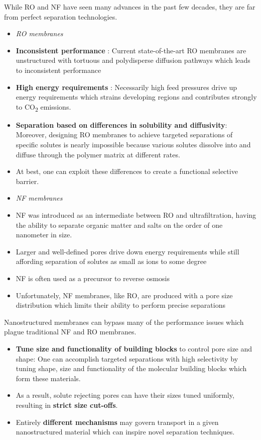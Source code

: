 \documentclass{article}
\begin{document}
  While RO and NF have seen many advances in the past few decades, they 
  are far from perfect separation technologies.
  \begin{itemize}
    \item \textit{RO membranes}
    \item \textbf{Inconsistent performance} : Current state-of-the-art RO membranes are unstructured with
    tortuous and polydisperse diffusion pathways which leads to 
    inconsistent performance \cite{song_nano_2011}
    \item \textbf{High energy requirements} : Necessarily high feed pressures 
    drive up energy requirements which strains developing regions and
    contributes strongly to CO\textsubscript{2} emissions. \cite{mcginnis_global_2008}
    \item \textbf{Separation based on differences in solubility and diffusivity}:
    Moreover, designing RO membranes to achieve targeted separations of 
    specific solutes is nearly impossible because various solutes dissolve
    into and diffuse through the polymer matrix at different rates. \cite{wijmans_solution-diffusion_1995}
    \item At best, one can exploit these differences to create a functional
    selective barrier.
    \item \textit{NF membranes}
    \item NF was introduced as an intermediate between RO and ultrafiltration,
    having the ability to separate organic matter and salts on the order of 
    one nanometer in size.
    \item Larger and well-defined pores drive down energy requirements while
    still affording separation of solutes as small as ions to some degree \cite{van_der_bruggen_review_2003}
    \item NF is often used as a precursor to reverse osmosis
    \item Unfortunately, NF membranes, like RO, are produced with a pore size 
    distribution which limits their ability to perform precise separations \cite{bowen_modelling_2002}
  \end{itemize}
  
  Nanostructured membranes can bypass many of the performance issues which
  plague traditional NF and RO membranes.
  \begin{itemize}
    \item \textbf{Tune size and functionality of building blocks} to control pore
    size and shape: One can accomplish targeted separations with high 
    selectivity by tuning shape, size and functionality of the molecular
    building blocks which form these materials. %
    \item As a result, solute rejecting pores can have their sizes tuned
    uniformly, resulting in \textbf{strict size cut-offs}.
    \item Entirely \textbf{different mechanisms} may govern transport in a given
    nanostructured material which can inspire novel separation techniques.
  \end{itemize}
  
\end{document}
